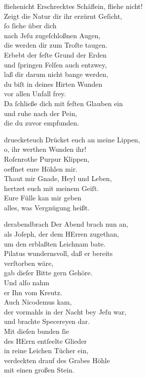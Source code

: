 \documentclass[tocstyle=ref-genre]{ees}
\begin{document}
{\clearpage
\begin{movement}{fliehenicht}
  Erschrecktes Schäflein, fliehe nicht!\\
  Zeigt die Natur dir ihr erzürnt Geſicht,\\
  ſo ſiehe über dich\\
  nach Jeſu zugeſchloßnen Augen,\\
  die werden dir zum Troſte taugen.\\
  Erbebt der feſte Grund der Erden\\
  und ſpringen Felſen auch entzwey,\\
  laß dir darum nicht bange werden,\\
  du biſt in deines Hirten Wunden\\
  vor allen Unfall frey.\\
  Da ſchließe dich mit feſten Glauben ein\\
  und ruhe nach der Pein,\\
  die du zuvor empfunden.
\end{movement}

\begin{movement}{druecketeuch}
  \voice[Coro]
  Drücket euch an meine Lippen,\\
  o, ihr werthen Wunden ihr!\\
  Roſenrothe Purpur Klippen,\\
  oeffnet eure Höhlen mir.\\
  Thaut mir Gnade, Heyl und Leben,\\
  hertzet euch mit meinem Geiſt.\\
  Eure Fülle kan mir geben\\
  alles, was Vergnügung heißt.
\end{movement}

\begin{movement}{derabendbrach}
  Der Abend brach nun an,\\
  als Joſeph, der dem HErren zugethan,\\
  um den erblaßten Leichnam bate.\\
  Pilatus wundernsvoll, daß er bereits\\
  verſtorben wäre,\\
  gab dieſer Bitte gern Gehöre.\\
  Und alſo nahm\\
  er Ihn vom Kreutz.\\
  Auch Nicodemus kam,\\
  der vormahls in der Nacht bey Jeſu war,\\
  und brachte Specereyen dar.\\
  Mit dieſen bunden ſie\\
  des HErrn entſeelte Glieder\\
  in reine Leichen Tücher ein,\\
  verdeckten drauf des Grabes Höhle\\
  mit einen großen Stein.
\end{movement}

}
\end{document}
